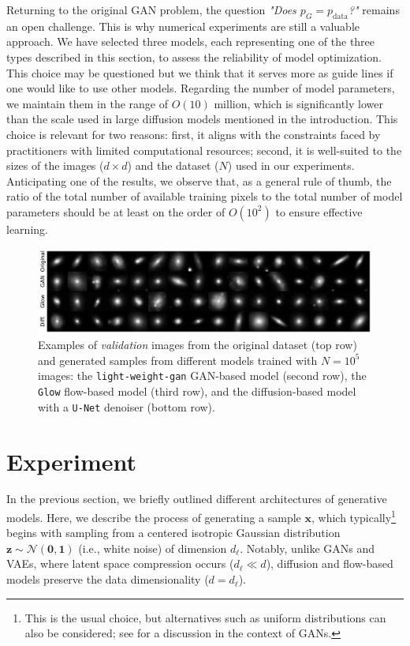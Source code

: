 \documentclass[fleqn,usenatbib]{mnras}
\begin{document}
{Returning to the original GAN problem, the question \textit{"Does $p_G = p_{\text{data}}$?"} remains an open challenge. This is why numerical experiments are still a valuable approach. We have selected three models, each representing one of the three types described in this section, to assess the reliability of model optimization. This choice may be questioned but we think that it serves more as guide lines if one would like to use other models. 
Regarding the number of model parameters, we maintain them in the range of $O(10)$ million, which is significantly lower than the scale used in large diffusion models mentioned in the introduction. This choice is relevant for two reasons: first, it aligns with the constraints faced by practitioners with limited computational resources; second, it is well-suited to the sizes of the images ($d \times d$) and the dataset ($N$) used in our experiments.  
Anticipating one of the results, we observe that, as a general rule of thumb, the ratio of the total number of available training pixels to the total number of model parameters should be at least on the order of $O(10^2)$ to ensure effective learning.
}


%
\begin{figure}
    \centering
        \includegraphics[width=0.8\linewidth]{fig-model_sample_images.pdf}
    \caption{Examples of \textit{validation} images from the original dataset (top row) and generated samples from different models trained with $N = 10^5$ images: the \texttt{light-weight-gan} GAN-based model (second row), the \texttt{Glow} flow-based model (third row), and the diffusion-based model with a \texttt{U-Net} denoiser (bottom row).}
    \label{fig-Original-Glow-UNet-Gan-samples}
\end{figure}

%
\section{Experiment}
\label{sec-experiment}
%
In the previous section, we briefly outlined different architectures of generative models. Here, we describe the process of generating a sample $\bm{x}$, which typically\footnote{This is the usual choice, but alternatives such as uniform distributions can also be considered; see \cite{Brock2019} for a discussion in the context of GANs.} begins with sampling from a centered isotropic Gaussian distribution $\bm{z} \sim \mathcal{N}(\bm{0}, \bm{1})$ (i.e., white noise) of dimension $d_\ell$. {\color{red} Notably, unlike GANs and VAEs, where latent space compression occurs ($d_\ell \ll d$), diffusion and flow-based models preserve the data dimensionality ($d = d_\ell$).}
\end{document}
